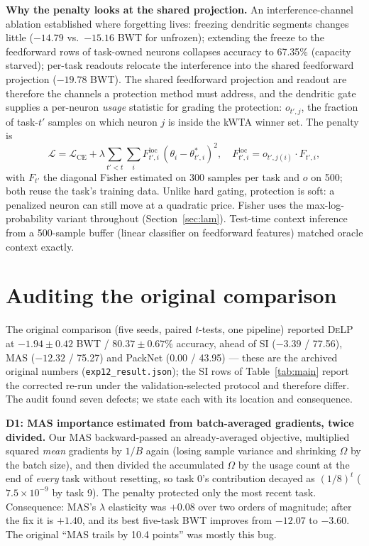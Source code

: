 \documentclass[conference]{IEEEtran}
\newcommand{\delp}{\textsc{DeLP}}
\begin{document}
\noindent\textbf{Why the penalty looks at the shared projection.} An interference-channel
ablation established where forgetting lives: freezing dendritic segments changes little
($-14.79$ vs.\ $-15.16$ BWT for unfrozen); extending the freeze to the feedforward rows of
task-owned neurons collapses accuracy to 67.35\% (capacity starved); per-task readouts relocate the
interference into the shared feedforward projection ($-19.78$ BWT). The shared feedforward
projection and readout are therefore the channels a protection method must address, and the
dendritic gate supplies a per-neuron \emph{usage} statistic for grading the protection:
$o_{t',j}$, the fraction of task-$t'$ samples on which neuron $j$ is inside the kWTA winner set.
The penalty is
\begin{equation}
\mathcal{L} = \mathcal{L}_{\mathrm{CE}} + \lambda \sum_{t' < t} \sum_{i} F^{\mathrm{loc}}_{t',i}\,
(\theta_i - \theta^{\ast}_{t',i})^2, \quad
F^{\mathrm{loc}}_{t',i} = o_{t',j(i)} \cdot F_{t',i},
\end{equation}
with $F_{t'}$ the diagonal Fisher estimated on 300 samples per task and $o$ on 500; both reuse the
task's training data. Unlike hard gating, protection is soft: a penalized neuron can still move at
a quadratic price. Fisher uses the max-log-probability variant throughout (Section~\ref{sec:lam}).
Test-time context inference from a 500-sample buffer (linear classifier on feedforward features)
matched oracle context exactly.

\section{Auditing the original comparison}\label{sec:audit}
The original comparison (five seeds, paired $t$-tests, one pipeline) reported \delp{} at
$-1.94\pm0.42$ BWT / $80.37\pm0.67$\% accuracy, ahead of SI ($-3.39$ / 77.56), MAS ($-12.32$ /
75.27) and PackNet (0.00 / 43.95) --- these are the archived original numbers
(\texttt{exp12\_result.json}); the SI rows of Table~\ref{tab:main} report the corrected re-run
under the validation-selected protocol and therefore differ. The audit found seven defects; we
state each with its location and consequence.

\noindent\textbf{D1: MAS importance estimated from batch-averaged gradients, twice divided.} Our
MAS backward-passed an already-averaged objective, multiplied squared \emph{mean} gradients by
$1/B$ again (losing sample variance and shrinking $\Omega$ by the batch size), and then divided the
accumulated $\Omega$ by the usage count at the end of \emph{every} task without resetting, so task
0's contribution decayed as $(1/8)^{t}$ ($7.5\times10^{-9}$ by task 9). The penalty protected only
the most recent task. Consequence: MAS's $\lambda$ elasticity was $+0.08$ over two orders of
magnitude; after the fix it is $+1.40$, and its best five-task BWT improves from $-12.07$ to
$-3.60$. The original ``MAS trails by 10.4 points'' was mostly this bug.
\end{document}
